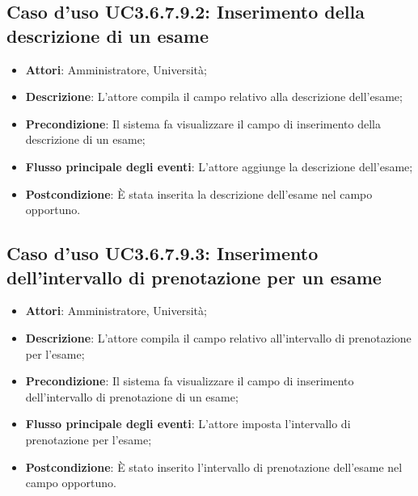 \subsection{Caso d'uso \texorpdfstring{UC3.6.7.9.2}{UC3.6.7.9.2}: Inserimento della descrizione di un esame}
\begin{itemize}
	\item \textbf{Attori}: Amministratore, Università;
	\item \textbf{Descrizione}: L'attore compila il campo relativo alla descrizione dell’esame;
	
	\item \textbf{Precondizione}: Il sistema fa visualizzare il campo di inserimento della descrizione di un esame;
	\item \textbf{Flusso principale degli eventi}: L'attore aggiunge la descrizione dell’esame;
	
	\item \textbf{Postcondizione}: È stata inserita la descrizione dell'esame nel campo opportuno.
	
\end{itemize}
\subsection{Caso d'uso \texorpdfstring{UC3.6.7.9.3}{UC3.6.7.9.3}: Inserimento dell’intervallo di prenotazione per un esame}
\begin{itemize}
	\item \textbf{Attori}: Amministratore, Università;
	\item \textbf{Descrizione}: L'attore compila il campo relativo all'intervallo di prenotazione per l'esame;
	
	\item \textbf{Precondizione}: Il sistema fa visualizzare il campo di inserimento dell'intervallo di prenotazione di un esame;
	
	\item \textbf{Flusso principale degli eventi}: L'attore imposta l'intervallo di prenotazione per l'esame;
	
	\item \textbf{Postcondizione}: È stato inserito l'intervallo di prenotazione dell'esame nel campo opportuno.
	
\end{itemize}
